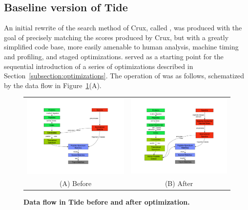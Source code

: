 \subsection{Baseline version of Tide \label{subsection:tidezero}}

An initial rewrite of the search method of Crux, called \tidezero, was
produced with the goal of precisely matching the \XCorr scores
produced by Crux, but with a greatly simplified code base, more easily
amenable to human analysis, machine timing and profiling, and staged
optimizations.  \tidezero served as a starting point for the
sequential introduction of a series of optimizations described in
Section~\ref{subsection:optimizations}. The operation of \tidezero was as
follows, schematized by the data flow in Figure~\ref{figure:dataflow}(A).

\begin{figure}
\centering
\begin{tabular}{cc}
\includegraphics[width=3.0in]{Diagrams_p1-p1-cropped.pdf} &
\includegraphics[width=3.0in]{Diagrams_p2-p2-cropped.pdf} \\
(A) Before & (B) After \\
\end{tabular}
\caption[Data flow in Tide before and after optimization]{{\bf Data flow
    in Tide before and after optimization.}
  \label{figure:dataflow}}
\end{figure}

